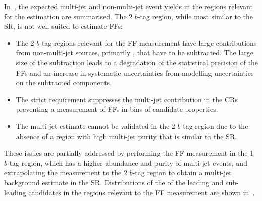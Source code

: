 In~, the expected multi-jet and non-multi-jet event
yields in the regions relevant for the \faketauhadvis estimation are
summarised. The 2 $b$-tag region, while most similar to the SR, is not well
suited to estimate FFs:
\begin{itemize}

\item The 2 $b$-tag regions relevant for the FF measurement have large
  contributions from non-multi-jet sources, primarily \ttbarFakes, that have to
  be subtracted. The large size of the subtraction leads to a degradation of the
  statistical precision of the FFs and an increase in systematic uncertainties
  from modelling uncertainties on the subtracted components.

\item The strict \btag requirement suppresses the multi-jet contribution in the
  CRs preventing a measurement of FFs in bins of \tauhadvis candidate
  properties.

\item The multi-jet estimate cannot be validated in the 2 $b$-tag region due to
  the absence of a region with high multi-jet purity that is similar to the SR.

\end{itemize}
These issues are partially addressed by performing the FF measurement in the 1
$b$-tag region, which has a higher abundance and purity of multi-jet events, and
extrapolating the measurement to the 2 $b$-tag region to obtain a multi-jet
background estimate in the SR. Distributions of the \pT of the leading and
sub-leading \tauhadvis candidates in the regions relevant to the FF measurement
are shown in~.

